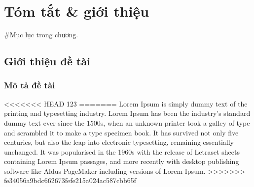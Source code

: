 \chapter{Tóm tắt \& giới thiệu}
\minitoc #Mục lục trong chương.
\newpage
\section{Giới thiệu đề tài}
\subsection{Mô tả đề tài}
<<<<<<< HEAD
123
=======
Lorem Ipsum is simply dummy text of the printing and typesetting industry. Lorem Ipsum has been the industry's standard dummy text ever since the 1500s, when an unknown printer took a galley of type and scrambled it to make a type specimen book. It has survived not only five centuries, but also the leap into electronic typesetting, remaining essentially unchanged. It was popularised in the 1960s with the release of Letraset sheets containing Lorem Ipsum passages, and more recently with desktop publishing software like Aldus PageMaker including versions of Lorem Ipsum.
>>>>>>> fe34056a9bdc662673fefe215a024ac587cbb65f
